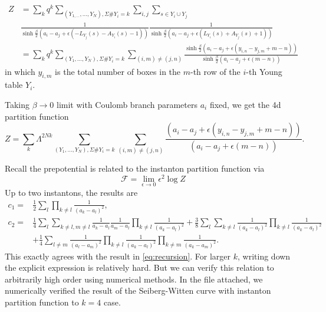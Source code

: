 \documentclass{article}
\begin{document}
\begin{equation}
\begin{aligned}
Z &=\sum_{k} q^{k} \sum_{\left(Y_{1, \ldots}, \ldots, Y_{N}\right), \Sigma \# Y_{i}=k} \sum_{i, j} \sum_{s \in Y_{i} \cup Y_{j}} \\
& \frac{1}{\sinh \frac{\beta}{2}\left(a_{i}-a_{j}+\epsilon\left(-L_{Y_{j}}(s)-A_{Y_{i}}(s)-1\right)\right)} \frac{1}{\sinh \frac{\beta}{2}\left(a_{i}-a_{j}+\epsilon\left(L_{Y_{i}}(s)+A_{Y_{j}}(s)+1\right)\right)} \\
&=\sum_{k} q^{k} \sum_{\left(Y_{1}, \ldots, Y_{N}\right), \Sigma \# Y_{i}=k} \sum_{(i, m) \neq(j, n)} \frac{\sinh \frac{\beta}{2}\left(a_{i}-a_{j}+\epsilon\left(y_{i, n}-y_{j, m}+m-n\right)\right)}{\sinh \frac{\beta}{2}\left(a_{i}-a_{j}+\epsilon(m-n)\right)}
\end{aligned}
\end{equation}
in which $y_{i,m}$ is the total number of boxes in the $m$-th row of the $i$-th Young table $Y_i$. 

Taking $\beta\to 0$ limit with Coulomb branch parameters $a_i$ fixed, we get the 4d partition function
\begin{equation}
Z=\sum_{k} \Lambda^{2 N k} \sum_{\left(Y_{1}, \ldots, Y_{N}\right), \Sigma \# Y_{i}=k} \sum_{(i, m) \neq(j, n)}
\frac{\left(a_{i}-a_{j}+\epsilon\left(y_{i, n}-y_{j, m}+m-n\right)\right)}{\left(a_{i}-a_{j}+\epsilon(m-n)\right)}.
\end{equation}

Recall the prepotential is related to the instanton partition function via
\begin{equation}
\mathscr{F}=\lim _{\epsilon \rightarrow 0} \epsilon^{2} \log Z
\end{equation}
Up to two instantons, the results are 
\begin{equation}
\begin{aligned}
c_1=& \frac{1}{2} \sum_{l} \prod_{k \neq l} \frac{1}{\left(a_{k}-a_{l}\right)^{2}}, \\
c_2=& \frac{1}{4} \sum_{l} \sum_{k \neq l, m \neq l} \frac{1}{a_{k}-a_{l}} \frac{1}{a_{m}-a_{l}} \prod_{k \neq l} \frac{1}{\left(a_{k}-a_{l}\right)^{2}}+\frac{3}{8} \sum_{l} \sum_{k \neq l} \frac{1}{\left(a_{k}-a_{l}\right)^{2}} \prod_{k \neq l} \frac{1}{\left(a_{k}-a_{l}\right)^{2}} \\
&+\frac{1}{4} \sum_{l \neq m} \frac{1}{\left(a_{l}-a_{m}\right)^{2}} \prod_{k \neq l} \frac{1}{\left(a_{k}-a_{l}\right)^{2}} \prod_{k \neq m} \frac{1}{\left(a_{k}-a_{m}\right)^{2}} .
\end{aligned}
\end{equation}
This exactly agrees with the result in \eqref{eq:recursion}. For larger $k$, writing down the explicit expression is relatively hard. But we can verify this relation to arbitrarily high order using numerical methods. In the file attached, we numerically verified the result of the Seiberg-Witten curve with instanton partition function to $k=4$ case.



\end{document}

